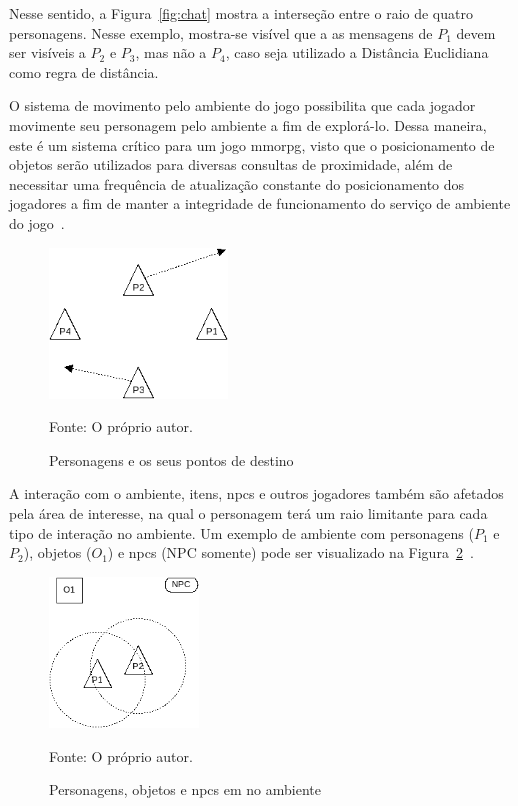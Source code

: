 Nesse sentido, a Figura~\ref{fig:chat} mostra a interseção entre o raio de quatro personagens.
%
Nesse exemplo, mostra-se visível que a as mensagens de $P_1$ devem ser visíveis a $P_2$ e $P_3$, mas não a $P_4$, caso seja utilizado a Distância Euclidiana como regra de distância.



O sistema de movimento pelo ambiente do jogo possibilita que cada jogador movimente seu personagem pelo ambiente a fim de explorá-lo.
%
Dessa maneira, este é um sistema crítico para um jogo \ac{mmorpg}, visto que o posicionamento de objetos serão utilizados para diversas consultas de proximidade, além de necessitar uma frequência de atualização constante do posicionamento dos jogadores a fim de manter a integridade de funcionamento do serviço de ambiente do jogo~\cite{albion_online_unite}.


\begin{figure}[htb!]
\caption{Personagens e os seus pontos de destino}
\label{fig:walk}
\includegraphics[height=4cm]{img/cap2/walk.png}
\centering

Fonte: O próprio autor.
\end{figure}



A interação com o ambiente, itens, \acp{npc} e outros jogadores também são afetados pela área de interesse, na qual o personagem terá um raio limitante para cada tipo de interação no ambiente.
%
Um exemplo de ambiente com personagens ($P_1$ e $P_2$), objetos ($O_1$) e \acp{npc} (NPC somente) pode ser visualizado na Figura~\ref{fig:obj_e_npc1}~\cite{albion_online_unite}.

\begin{figure}[htb!]
\caption{Personagens, objetos e \acp{npc} em no ambiente}
\label{fig:obj_e_npc1}
\includegraphics[height=4cm]{img/cap2/obj_e_npc1.png}
\centering

Fonte: O próprio autor.
\end{figure}

